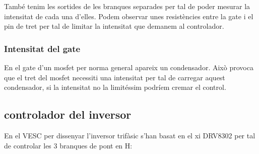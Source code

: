      
També tenim les sortides de les branques separades per tal de poder mesurar la intensitat de cada una d'elles. Podem observar unes resistències entre la gate i el pin de tret per tal de limitar la intensitat que demanem al controlador.

\subsubsection{Intensitat del gate}
 En el gate d'un mosfet per norma general apareix un condensador. Això provoca que el tret del mosfet necessiti una intensitat per tal de carregar aquest condensador, si la intensitat no la limitéssim podríem cremar el control.
     
\subsection{controlador del inversor}
En el VESC per dissenyar l'inversor trifàsic s'han basat en el xi DRV8302 per tal de controlar les 3 branques de pont en H:

